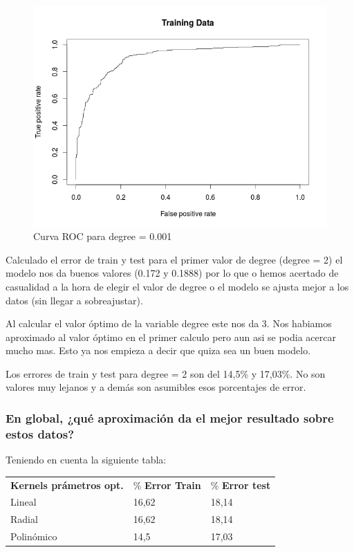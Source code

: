 \begin{figure}[H]
\centering
\includegraphics[scale=0.50]{ej1-65.png}
\caption{Curva ROC para degree = 0.001}
\label{}
\end{figure}

Calculado el error de train y test para el primer valor de degree (degree = 2) el modelo nos da buenos valores (0.172 y 0.1888) por lo que o hemos acertado de casualidad a la hora de elegir el valor de degree o el modelo se ajusta mejor a los datos (sin llegar a sobreajustar).

Al calcular el valor óptimo de la variable degree este nos da 3. Nos habiamos aproximado al valor óptimo en el primer calculo pero aun asi se podia acercar mucho mas. Esto ya nos empieza a decir que quiza sea un buen modelo.

Los errores de train y test para degree = 2 son del 14,5\% y 17,03\%. No son valores muy lejanos y a demás son asumibles esos porcentajes de error.

\subsubsection{En global, ¿qué aproximación da el mejor resultado sobre estos datos?}

Teniendo en cuenta la siguiente tabla:\\

\begin{tabular}{lll}
	\textbf{Kernels prámetros opt.} & \% \textbf{Error Train} & \% \textbf{Error test}\\
	Lineal & 16,62 & 18,14\\
	Radial & 16,62 & 18,14\\
	Polinómico & 14,5 & 17,03\\
\end{tabular}\\

